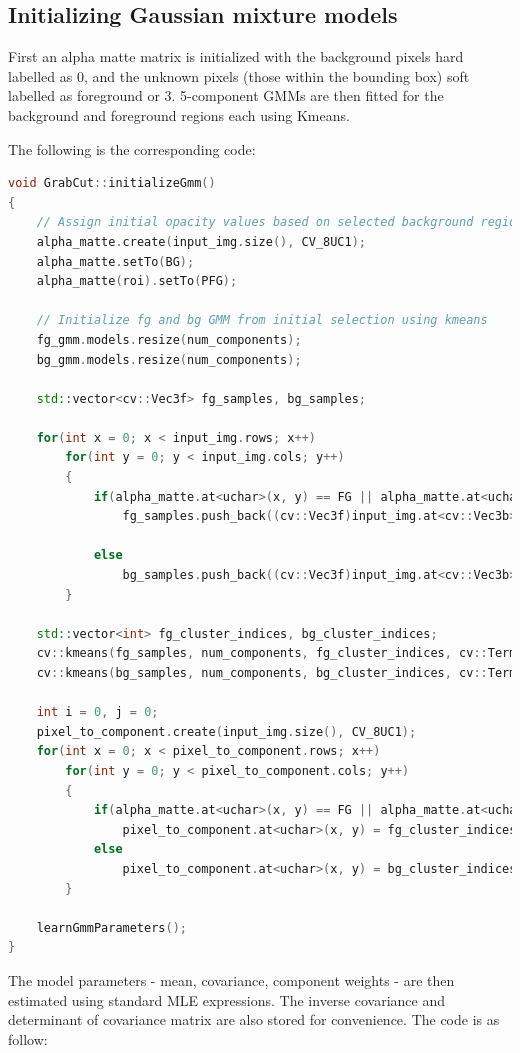\documentclass[a4paper,11]{article}
\begin{document}
  
  \subsection{Initializing Gaussian mixture models}
  
  First an alpha matte matrix is initialized with the background pixels hard labelled as $0$, and the unknown pixels (those within the bounding box) soft labelled as foreground or $3$. 5-component GMMs are then fitted for the background and foreground regions each using Kmeans. 
  
  The following is the corresponding code:
  \begin{lstlisting}[language=C++]
void GrabCut::initializeGmm()
{
	// Assign initial opacity values based on selected background region
	alpha_matte.create(input_img.size(), CV_8UC1);	
	alpha_matte.setTo(BG);
	alpha_matte(roi).setTo(PFG);

	// Initialize fg and bg GMM from initial selection using kmeans
	fg_gmm.models.resize(num_components);
	bg_gmm.models.resize(num_components);

	std::vector<cv::Vec3f> fg_samples, bg_samples;

	for(int x = 0; x < input_img.rows; x++)
		for(int y = 0; y < input_img.cols; y++)
		{
			if(alpha_matte.at<uchar>(x, y) == FG || alpha_matte.at<uchar>(x, y) == PFG)
				fg_samples.push_back((cv::Vec3f)input_img.at<cv::Vec3b>(x, y));

			else
				bg_samples.push_back((cv::Vec3f)input_img.at<cv::Vec3b>(x, y));
		}

	std::vector<int> fg_cluster_indices, bg_cluster_indices;
	cv::kmeans(fg_samples, num_components, fg_cluster_indices, cv::TermCriteria(CV_TERMCRIT_ITER, 10, 0.0), 0, cv::KMEANS_PP_CENTERS);
	cv::kmeans(bg_samples, num_components, bg_cluster_indices, cv::TermCriteria(CV_TERMCRIT_ITER, 10, 0.0), 0, cv::KMEANS_PP_CENTERS);

	int i = 0, j = 0;
	pixel_to_component.create(input_img.size(), CV_8UC1);
	for(int x = 0; x < pixel_to_component.rows; x++)
		for(int y = 0; y < pixel_to_component.cols; y++)
		{
			if(alpha_matte.at<uchar>(x, y) == FG || alpha_matte.at<uchar>(x, y) == PFG)
				pixel_to_component.at<uchar>(x, y) = fg_cluster_indices[i++];
			else
				pixel_to_component.at<uchar>(x, y) = bg_cluster_indices[j++];
		}

	learnGmmParameters();
}
  \end{lstlisting}
  
  The model parameters - mean, covariance, component weights - are then estimated using standard MLE expressions. The inverse covariance and determinant of covariance matrix are also stored for convenience. The code is as follow:
  
\end{document}
